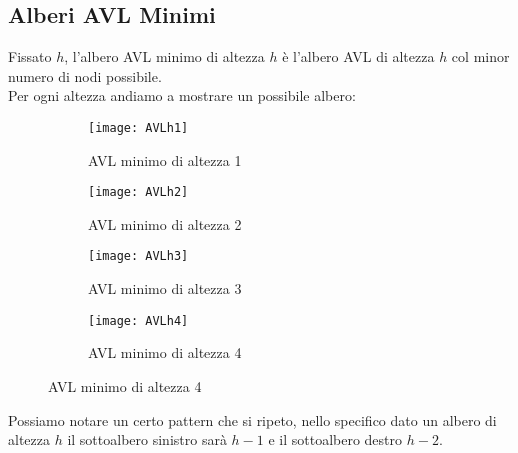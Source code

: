 \subsection{Alberi AVL Minimi}
Fissato $h$, l'albero AVL minimo di altezza $h$ è l'albero AVL di altezza $h$ col minor numero di nodi possibile.\\
Per ogni altezza andiamo a mostrare un possibile albero:

\begin{figure}[H]
    \centering
    \begin{subfigure}[b]{0.35\textwidth}
        \texttt{[image: AVLh1]} 
        \caption{AVL minimo di altezza 1}
    \end{subfigure}
    \hfill
    \begin{subfigure}[b]{0.45\textwidth}
        \texttt{[image: AVLh2]} 
        \caption{AVL minimo di altezza 2}
    \end{subfigure}
    \hfill
    \begin{subfigure}[b]{0.45\textwidth}
        \texttt{[image: AVLh3]} 
        \caption{AVL minimo di altezza 3}
    \end{subfigure}
    \hfill
    \begin{subfigure}[b]{0.45\textwidth}
        \texttt{[image: AVLh4]} 
        \caption{AVL minimo di altezza 4}
    \end{subfigure}
\end{figure}
Possiamo notare un certo pattern che si ripeto, nello specifico dato un albero di altezza $h$ il sottoalbero sinistro sarà $h-1$ e il sottoalbero destro $h-2$.\\
